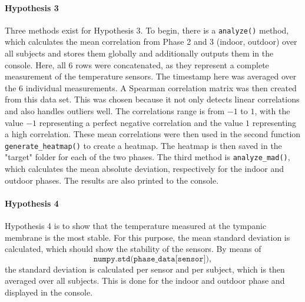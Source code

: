 \paragraph{Hypothesis 3}
Three methods exist for Hypothesis 3.
To begin, there is a \texttt{analyze()} method, which calculates the mean correlation from Phase 2 and 3 (indoor, outdoor) over all subjects and stores them globally and additionally outputs them in the console.
Here, all 6 rows were concatenated, as they represent a complete measurement of the temperature sensors. 
The timestamp here was averaged over the 6 individual measurements.
A Spearman correlation matrix was then created from this data set. 
This was chosen because it not only detects linear correlations and also handles outliers well.
The correlations range is from $-1$ to $1$, with the value $-1$ representing a perfect negative correlation and the value $1$ representing a high correlation.
These mean correlations were then used in the second function \texttt{generate\_heatmap()} to create a heatmap. 
The heatmap is then saved in the "target" folder for each of the two phases.
The third method is \texttt{analyze\_mad()}, which calculates the mean absolute deviation, respectively for the indoor and outdoor phases.
The results are also printed to the console.

\paragraph{Hypothesis 4}
Hypothesis 4 is to show that the temperature measured at the tympanic membrane is the most stable. 
For this purpose, the mean standard deviation is calculated, which should show the stability of the sensors. 
By means of 
\[
    \texttt{numpy.std(phase\_data[sensor])},
\]
the standard deviation is calculated per sensor and per subject, which is then averaged over all subjects.
This is done for the indoor and outdoor phase and displayed in the console.

